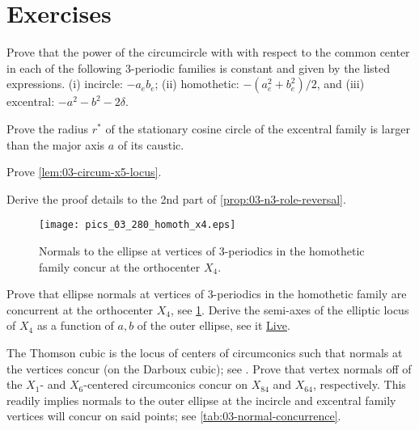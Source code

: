 \section{Exercises}

\begin{exercise}
 \label{ex:03-power-euler} 
Prove that the power of the circumcircle with with respect to the common center in each of the following 3-periodic families is constant and given by the listed expressions. (i) incircle: $-a_e b_e$; (ii) homothetic: $-({a_e^2+b_e^2})/{2}$, and (iii) excentral: $-a^2-b^2-2\delta$. 
\end{exercise}

\begin{exercise}
\label{ex:03-cosine-circle}
Prove the radius $r^*$ of the stationary cosine circle of the excentral family is larger than the major axis $a$ of its caustic. 
\end{exercise}

\begin{exercise}
Prove \cref{lem:03-circum-x5-locus}.
\label{ex:03-circum-x5-locus}
\end{exercise}

\begin{exercise}
Derive the proof details to the 2nd part of \cref{prop:03-n3-role-reversal}.
\end{exercise}

\begin{figure}
    \centering
    \texttt{[image: pics\_03\_280\_homoth\_x4.eps]}
    \caption{Normals to the ellipse at vertices of 3-periodics in the homothetic family concur at the orthocenter $X_4$.}
    \label{fig:03-homoth-x4}
\end{figure}

\begin{exercise}
Prove that ellipse normals at vertices of 3-periodics in the homothetic family are concurrent at the orthocenter $X_4$, see \cref{fig:03-homoth-x4}. Derive the semi-axes of the elliptic locus of $X_4$ as a function of $a,b$ of the outer ellipse, see it \href{https://bit.ly/3fpESjh}{Live}.  
\label{ex:03-homoth-x4}
\end{exercise}

\begin{exercise}
The Thomson cubic is the locus of centers of circumconics such that normals at the vertices concur (on the Darboux cubic); see \cite[Darboux and Thomson cubics]{gibert2021-ctc}. Prove that vertex normals off of the $X_1$- and $X_6$-centered circumconics concur on $X_{84}$ and $X_{64}$, respectively. This readily implies normals to the outer ellipse at the incircle and excentral family vertices will concur on said points; see \cref{tab:03-normal-concurrence}. 
\end{exercise}

